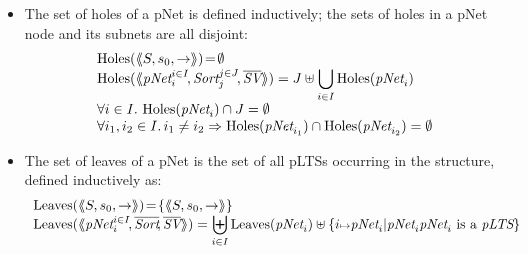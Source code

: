 \documentclass{llncs}
\begin{document}
\begin{definition}
\begin{itemize}
\item
The set of holes of a pNet is defined inductively; the sets of holes
in a pNet node and its subnets are all disjoint:
  \[\begin{array}{l}
\Holes(\mylangle S,s_0, \to\myrangle) \!=\! \emptyset \\
\Holes(\mylangle \pNet_i^{i\in I}\!,\Sort_j^{j\in J}\!, \overline{\symb{SV}}\myrangle) 
=J\uplus{\displaystyle \bigcup_{i\in 
I}\Holes(\pNet_i)}\\
\forall i\in I.\, \Holes(\pNet_i)\cap J=\emptyset\\
\forall i_1,i_2\in I.\,i_1\neq i_2\Rightarrow  
\Holes(\pNet_{i_1})\cap\Holes(\pNet_{i_2})=\emptyset
\end{array}\]
\item
The set of leaves of a pNet is the set of all pLTSs occurring in the structure, defined 
inductively as:
\[\begin{array}{l}
\Leaves(\mylangle S,s_0, \to\myrangle) \!=\!\{\mylangle S,s_0, \to\myrangle\}\\
\Leaves(\mylangle \pNet_i^{i\in I}\!,%
\overline{\Sort}\!, \overline{\symb{SV}}\myrangle) = {\displaystyle \biguplus_{i\in 
I}\Leaves(\pNet_i)\uplus\{i\mapsto \pNet_i|\pNet_i\pNet_i \text{ is a }\pLTS\}}
\end{array}\]
\end{itemize}
\end{definition}
\end{document}
